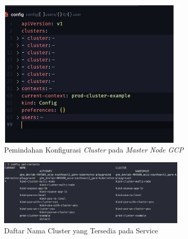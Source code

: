 \begin{figure}[ht]
  \centering
  \includegraphics[width=0.8\textwidth]{resources/chapter-4/pengujian/kube-gcp-08.jpg}
  \caption{Pemindahan Konfigurasi \textit{Cluster} pada \textit{Master Node GCP}}
  \label{fig:proses-pemindahan-konfigurasi-master-gcp}
\end{figure}

\begin{figure}[ht]
  \centering
  \includegraphics[width=0.8\textwidth]{resources/chapter-4/pengujian/p00.jpg}
  \caption{Daftar Nama Cluster yang Tersedia pada Service}
  \label{fig:list-cluster-tersedia}
\end{figure}


